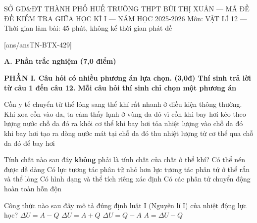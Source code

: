 \def\toanlop{12}
\def\thoigian{45}
\def\namhoc{2025 - 2026}
\begin{dethi}
	{SỞ GD\&ĐT THÀNH PHỐ HUẾ}
	{TRƯỜNG THPT BÙI THỊ XUÂN --- MÃ ĐỀ \thedeso}
	{ĐỀ KIỂM TRA GIỮA HỌC KÌ I --- NĂM HỌC 2025-2026}
	{Môn: VẬT LÍ 12 --- Thời gian làm bài: 45 phút, không kể thời gian phát đề}
\end{dethi}

[ans/ansTN-BTX-429]

\noindent \textbf{A. Phần trắc nghiệm (7,0 điểm)}

\noindent \textbf{PHẦN I. Câu hỏi có nhiều phương án lựa chọn. (3,0đ) Thí sinh trả lời từ câu 1 đến câu 12. Mỗi câu hỏi thí sinh chỉ chọn một phương án}
\vspace{0.2cm}

\begin{ex}%
	Cồn y tế chuyển từ thể lỏng sang thể khí rất nhanh ở điều kiện thông thường. Khi xoa cồn vào da, ta cảm thấy lạnh ở vùng da đó vì cồn
	\choice
	{khi bay hơi kéo theo lượng nước chỗ da đó ra khỏi cơ thể}
	{khi bay hơi tỏa nhiệt lượng vào chỗ da đó}
	{khi bay hơi tạo ra dòng nước mát tại chỗ da đó}
	{\True thu nhiệt lượng từ cơ thể qua chỗ da đó để bay hơi}
\end{ex}

\begin{ex}%
	Tính chất nào sau đây \textbf{không} phải là tính chất của chất ở thể khí?
	\choice
	{Có thể nén được dễ dàng}
	{Có lực tương tác phân tử nhỏ hơn lực tương tác phân tử ở thể rắn và thể lỏng}
	{\True Có hình dạng và thể tích riêng xác định}
	{Có các phân tử chuyển động hoàn toàn hỗn độn}
\end{ex}

\begin{ex}%
	Công thức nào sau đây mô tả đúng định luật I (Nguyên lí I) của nhiệt động lực học?
	\choice
	{$\Delta U=A-Q$}
	{\True $\Delta U=A+Q$}
	{$\Delta U=Q-A$}
	{$A=\Delta U-Q$}
\end{ex}


